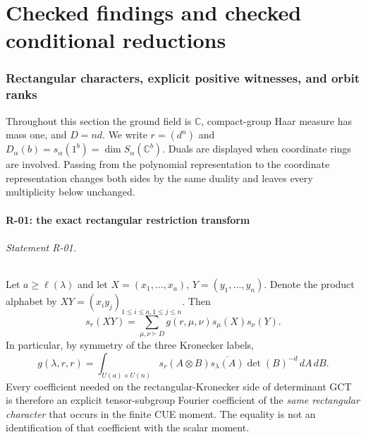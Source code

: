 \documentclass[11pt,a4paper]{article}
\theoremstyle{definition}\newtheorem{definition}{Definition}
\begin{document}
\part{Checked findings and checked conditional reductions}


\section{Rectangular characters, explicit positive witnesses, and orbit ranks}

Throughout this section the ground field is $\mathbb C$, compact-group Haar
measure has mass one, and $D=nd$. We write $r=(d^n)$ and
$D_\alpha(b)=s_\alpha(1^b)=\dim S_\alpha(\mathbb C^b)$.
Duals are displayed when coordinate rings are involved. Passing from the
polynomial representation to the coordinate representation changes both sides
by the same duality and leaves every multiplicity below unchanged.

\subsection{R-01: the exact rectangular restriction transform}

\paragraph{Statement R-01.}
Let $a\geq\ell(\lambda)$ and let $X=(x_1,\ldots,x_a)$,
$Y=(y_1,\ldots,y_n)$. Denote the product alphabet by
$XY=(x_i y_j)_{1\leq i\leq a,1\leq j\leq n}$. Then
\begin{equation}\label{R01:branching}
 s_r(XY)=\sum_{\mu,\nu\vdash D}
 g(r,\mu,\nu)s_\mu(X)s_\nu(Y).
\end{equation}
In particular, by symmetry of the three Kronecker labels,
\begin{equation}\label{R01:haar}
 g(\lambda,r,r)=\int_{U(a)\times U(n)}
 s_r(A\otimes B)\overline{s_\lambda(A)}\det(B)^{-d}\,dA\,dB.
\end{equation}
Every coefficient needed on the rectangular-Kronecker side of determinant
GCT is therefore an explicit tensor-subgroup Fourier coefficient of the
\emph{same rectangular character} that occurs in the finite CUE moment.
The equality is not an identification of that coefficient with the scalar
moment.
\end{document}

